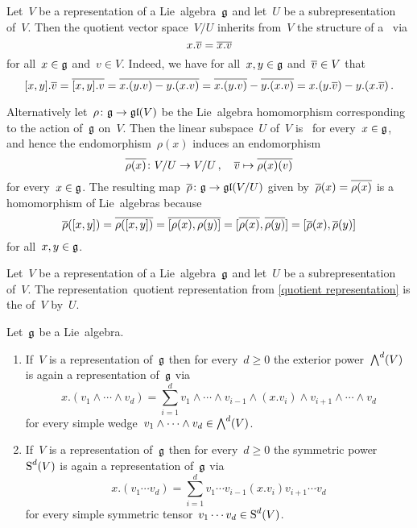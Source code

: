 \begin{example}
  \label{quotient representation}
  Let~$V$ be a representation of a Lie~algebra~$\glie$ and let~$U$ be a subrepresentation of~$V$.
  Then the quotient vector space~$V/U$ inherits from~$V$ the structure of a~{\representation{$\glie$}} via
  \[
    x.\overline{v}
    =
    \overline{x.v}
  \]
  for all~$x \in \mathfrak{g}$ and~$v \in V$.
  Indeed, we have for all~$x, y \in \mathfrak{g}$ and~$\overline{v} \in V$ that
  \[
    [x,y].\overline{v}
    =
    \overline{[x,y].v}
    =
    \overline{x.(y.v) - y.(x.v)}
    =
    \overline{x.(y.v)} - \overline{y.(x.v)}
    =
    x.(y.\overline{v}) - y.(x.\overline{v}) \,.
  \]
  
  Alternatively let~$\rho \colon \mathfrak{g} \to \mathfrak{gl}(V)$ be the Lie~algebra homomorphism corresponding to the action of~$\glie$ on~$V$.
  Then the linear subspace~$U$ of~$V$ is~{} for every~$x \in \mathfrak{g}$, and hence the endomorphism~$\rho(x)$ induces an endomorphism
  \[
    \overline{\rho(x)}
    \colon
    V/U
    \to
    V/U \,,
    \quad
    \overline{v}
    \mapsto
    \overline{\rho(x)(v)}
  \]
  for every~$x \in \mathfrak{g}$.
  The resulting map~$\overline{\rho} \colon \mathfrak{g} \to \mathfrak{gl}(V/U)$ given by~$\overline{\rho}(x) = \overline{\rho(x)}$  is a homomorphism of Lie~algebras because
  \[
    \overline{\rho}([x,y])
    =
    \overline{\rho([x,y])}
    =
    \overline{[\rho(x), \rho(y)]}
    =
    [\overline{\rho(x)}, \overline{\rho(y)}]
    =
    [\overline{\rho}(x), \overline{\rho}(y)]
  \]
  for all~$x, y \in \mathfrak{g}$.
\end{example}


\begin{definition}
  Let~$V$ be a representation of a Lie~algebra~$\glie$ and let~$U$ be a subrepresentation of~$V$.
  The representation~\gls*{quotient representation} from \cref{quotient representation} is the  of~$V$ by~$U$.
\end{definition}


\begin{lemma}
  Let~$\glie$ be a Lie~algebra.
  \begin{enumerate}
    \item
      If~$V$ is a representation of~$\glie$ then for every~$d \geq 0$ the exterior power~$\bigwedge^d(V)$ is again a representation of~$\glie$ via
      \[
        x.(v_1 \wedge \dotsb \wedge v_d)
        =
        \sum_{i=1}^d
        v_1 \wedge \dotsb \wedge v_{i-1} \wedge (x.v_i) \wedge v_{i+1} \wedge \dotsb \wedge v_d
      \]
      for every simple wedge~$v_1 \wedge \dotsb \wedge v_d \in \bigwedge^d(V)$.
    \item
      If~$V$ is a representation of~$\glie$ then for every~$d \geq 0$ the symmetric power~$\operatorname{S}^d(V)$ is again a representation of~$\glie$ via
      \[
        x.(v_1 \dotsm v_d)
        =
        \sum_{i=1}^d
        v_1 \dotsm v_{i-1} (x.v_i) v_{i+1} \dotsm v_d
      \]
      for every simple symmetric tensor~$v_1 \dotsm v_d \in \operatorname{S}^d(V)$.
  \end{enumerate}
\end{lemma}


